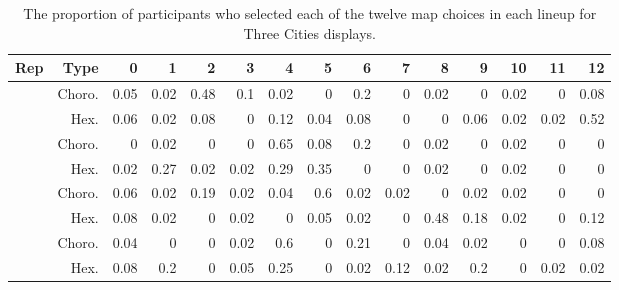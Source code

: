 \documentclass{monashthesis}
\begin{document}
\begin{table}

\caption{\label{tab:choice-three}The proportion of participants who selected each of the twelve map choices in each lineup for Three Cities displays.}
\centering
\begin{tabular}[t]{r|r|r|r|r|r|r|r|r|r|r|r|r|r|r}
\hline
Rep & Type & 0 & 1 & 2 & 3 & 4 & 5 & 6 & 7 & 8 & 9 & 10 & 11 & 12\\
\hline
 & Choro. & 0.05 & 0.02 & 0.48 & 0.1 & 0.02 & 0 & 0.2 & 0 & 0.02 & 0 & 0.02 & 0 & 0.08\\
\cline{2-15}
\multirow{-2}{*}{\raggedleft\arraybackslash 1} & Hex. & 0.06 & 0.02 & 0.08 & 0 & 0.12 & 0.04 & 0.08 & 0 & 0 & 0.06 & 0.02 & 0.02 & 0.52\\
\cline{1-15}
 & Choro. & 0 & 0.02 & 0 & 0 & 0.65 & 0.08 & 0.2 & 0 & 0.02 & 0 & 0.02 & 0 & 0\\
\cline{2-15}
\multirow{-2}{*}{\raggedleft\arraybackslash 2} & Hex. & 0.02 & 0.27 & 0.02 & 0.02 & 0.29 & 0.35 & 0 & 0 & 0.02 & 0 & 0.02 & 0 & 0\\
\cline{1-15}
 & Choro. & 0.06 & 0.02 & 0.19 & 0.02 & 0.04 & 0.6 & 0.02 & 0.02 & 0 & 0.02 & 0.02 & 0 & 0\\
\cline{2-15}
\multirow{-2}{*}{\raggedleft\arraybackslash 3} & Hex. & 0.08 & 0.02 & 0 & 0.02 & 0 & 0.05 & 0.02 & 0 & 0.48 & 0.18 & 0.02 & 0 & 0.12\\
\cline{1-15}
 & Choro. & 0.04 & 0 & 0 & 0.02 & 0.6 & 0 & 0.21 & 0 & 0.04 & 0.02 & 0 & 0 & 0.08\\
\cline{2-15}
\multirow{-2}{*}{\raggedleft\arraybackslash 4} & Hex. & 0.08 & 0.2 & 0 & 0.05 & 0.25 & 0 & 0.02 & 0.12 & 0.02 & 0.2 & 0 & 0.02 & 0.02\\
\hline
\end{tabular}
\end{table}
\end{document}
